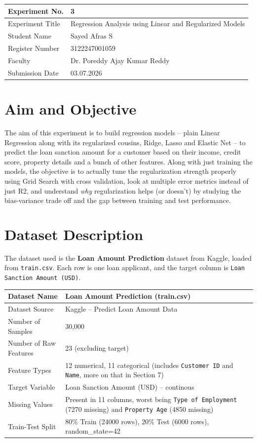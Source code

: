 \documentclass[12pt,a4paper]{article}
\begin{document}
\begin{tabular}{|p{4cm}|p{11cm}|}
\hline
Experiment No. & 3 \\ \hline
Experiment Title & Regression Analysis using Linear and Regularized Models \\ \hline
Student Name & Sayed Afras S \\ \hline
Register Number & 3122247001059 \\ \hline
Faculty & Dr. Poreddy Ajay Kumar Reddy \\ \hline
Submission Date & 03.07.2026 \\ \hline
\end{tabular}

\section{Aim and Objective}
The aim of this experiment is to build regression models -- plain Linear Regression along with its regularized cousins, Ridge, Lasso and Elastic Net -- to predict the loan sanction amount for a customer based on their income, credit score, property details and a bunch of other features. Along with just training the models, the objective is to actually tune the regularization strength properly using Grid Search with cross validation, look at multiple error metrics instead of just R2, and understand \textit{why} regularization helps (or doesn't) by studying the bias-variance trade off and the gap between training and test performance.

\section{Dataset Description}
The dataset used is the \textbf{Loan Amount Prediction} dataset from Kaggle, loaded from \texttt{train.csv}. Each row is one loan applicant, and the target column is \texttt{Loan Sanction Amount (USD)}.

\begin{longtable}{|p{6cm}|p{8cm}|}
\hline
Dataset Name & Loan Amount Prediction (train.csv) \\ \hline
Dataset Source & Kaggle -- Predict Loan Amount Data \\ \hline
Number of Samples & 30,000 \\ \hline
Number of Raw Features & 23 (excluding target) \\ \hline
Feature Types & 12 numerical, 11 categorical (includes \texttt{Customer ID} and \texttt{Name}, more on that in Section 7) \\ \hline
Target Variable & Loan Sanction Amount (USD) -- continous \\ \hline
Missing Values & Present in 11 columns, worst being \texttt{Type of Employment} (7270 missing) and \texttt{Property Age} (4850 missing) \\ \hline
Train-Test Split & 80\% Train (24000 rows), 20\% Test (6000 rows), random\_state=42 \\ \hline
\end{longtable}
\end{document}
